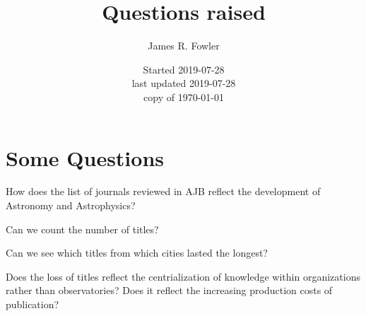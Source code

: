 \documentclass{article}
\begin{document}
\title{Questions raised}
\author{James R. Fowler}
\date{Started 2019-07-28\\ last updated 2019-07-28\\ copy of \today}
\maketitle

\section{Some Questions}

How does the list of journals reviewed in AJB reflect the
development of  Astronomy and Astrophysics?

Can we count the number of titles?

Can we see which titles from which cities lasted the longest?

Does the loss of titles reflect the centrialization of knowledge
within organizations rather than observatories? Does it reflect the
increasing production costs of publication?

\vfil\eject

\printbibliography
\end{document}
